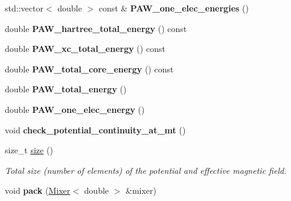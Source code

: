 \begin{DoxyCompactItemize}
\item 
\hypertarget{classsirius_1_1_potential_a1af2a4f2ca781f0c842fe22c8bcc0ec9}{}std\+::vector$<$ double $>$ const \& {\bfseries P\+A\+W\+\_\+one\+\_\+elec\+\_\+energies} ()\label{classsirius_1_1_potential_a1af2a4f2ca781f0c842fe22c8bcc0ec9}

\item 
\hypertarget{classsirius_1_1_potential_ae50b9ec60146386653585ec486a596ef}{}double {\bfseries P\+A\+W\+\_\+hartree\+\_\+total\+\_\+energy} () const \label{classsirius_1_1_potential_ae50b9ec60146386653585ec486a596ef}

\item 
\hypertarget{classsirius_1_1_potential_a6b05b8c5036288a410dcbd3194bb74dd}{}double {\bfseries P\+A\+W\+\_\+xc\+\_\+total\+\_\+energy} () const \label{classsirius_1_1_potential_a6b05b8c5036288a410dcbd3194bb74dd}

\item 
\hypertarget{classsirius_1_1_potential_a4bdf7caa8cf160a2e12a5bd4861d158b}{}double {\bfseries P\+A\+W\+\_\+total\+\_\+core\+\_\+energy} () const \label{classsirius_1_1_potential_a4bdf7caa8cf160a2e12a5bd4861d158b}

\item 
\hypertarget{classsirius_1_1_potential_a59352b8aeb4d6f99ea3989a8ac0b8a80}{}double {\bfseries P\+A\+W\+\_\+total\+\_\+energy} ()\label{classsirius_1_1_potential_a59352b8aeb4d6f99ea3989a8ac0b8a80}

\item 
\hypertarget{classsirius_1_1_potential_a8d2b0a795b5cf57f24180ca17f705237}{}double {\bfseries P\+A\+W\+\_\+one\+\_\+elec\+\_\+energy} ()\label{classsirius_1_1_potential_a8d2b0a795b5cf57f24180ca17f705237}

\item 
\hypertarget{classsirius_1_1_potential_a70e4eb1dbbe61223cfa9ec8e21f90252}{}void {\bfseries check\+\_\+potential\+\_\+continuity\+\_\+at\+\_\+mt} ()\label{classsirius_1_1_potential_a70e4eb1dbbe61223cfa9ec8e21f90252}

\item 
size\+\_\+t \hyperlink{classsirius_1_1_potential_ac44993cfb63ba04c3c9f4cc472652852}{size} ()
\begin{DoxyCompactList}\small\item\em Total size (number of elements) of the potential and effective magnetic field. \end{DoxyCompactList}\item 
\hypertarget{classsirius_1_1_potential_ab22e33a6cda1b03e1e5edeaa822c100b}{}void {\bfseries pack} (\hyperlink{classsirius_1_1_mixer}{Mixer}$<$ double $>$ \&mixer)\label{classsirius_1_1_potential_ab22e33a6cda1b03e1e5edeaa822c100b}


\end{DoxyCompactItemize}
